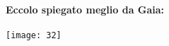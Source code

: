 \documentclass[12pt, a4paper, openany, oneside]{book}
\begin{document}
\paragraph{Eccolo spiegato meglio da Gaia:}
\begin{center}
\texttt{[image: 32]}
\end{center}
















































































































































	
\end{document}
